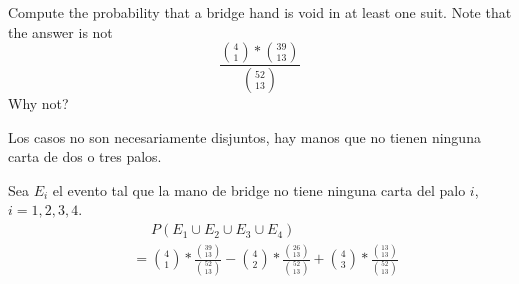 \item Compute the probability that a bridge hand is void in at least one suit. Note that the answer is not
\[ \frac{\binom{4}{1} * \binom{39}{13}}{\binom{52}{13}} \]
Why not?

Los casos no son necesariamente disjuntos, hay manos que no tienen ninguna carta de dos o tres palos.

Sea $E_i$ el evento tal que la mano de bridge no tiene ninguna carta del palo $i$, $i = 1,2,3,4$.
\begin{align*}
    &\phantom{{}={}} P(E_1\cup E_2\cup E_3\cup E_4)\\
    &= \binom{4}{1} * \frac{\binom{39}{13}}{\binom{52}{13}}
    -  \binom{4}{2} * \frac{\binom{26}{13}}{\binom{52}{13}}
    +  \binom{4}{3} * \frac{\binom{13}{13}}{\binom{52}{13}}
\end{align*}